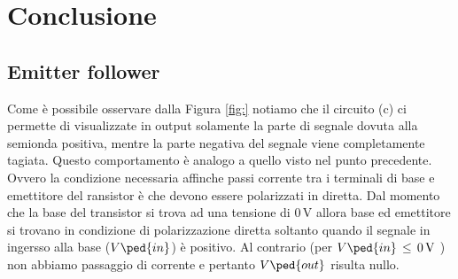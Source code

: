 \section*{Conclusione}

\subsection*{Emitter follower}

Come è possibile osservare dalla Figura \ref{fig:} notiamo che il circuito (c) ci permette di visualizzate in output solamente la parte di segnale dovuta alla semionda positiva, mentre la parte negativa del segnale viene completamente tagiata. Questo comportamento è analogo a quello visto nel punto precedente. Ovvero la condizione necessaria affinche passi corrente tra i terminali di base e emettitore del ransistor è che devono essere polarizzati in diretta. Dal momento che la base del transistor si trova ad una tensione di $0\,\si{\volt}$ allora base ed emettitore si trovano in condizione di polarizzazione diretta soltanto quando il segnale in ingersso alla base ($V\ped{in}$) è positivo. Al contrario (per $V\ped{in}\,\leq\,0\,\si{\volt}$ ) non abbiamo passaggio di corrente e pertanto $V\ped{out}$ risulta nullo.
